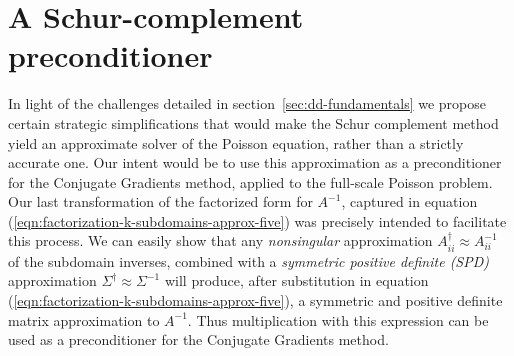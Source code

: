 \section{A Schur-complement preconditioner}
\label{sec:schur-complement-preconditioner}

In light of the challenges detailed in section~\ref{sec:dd-fundamentals} we propose certain strategic simplifications that would make the Schur complement method
yield an approximate solver of the Poisson equation, rather than a strictly accurate one. Our intent would be to use this approximation as a preconditioner for the
Conjugate Gradients method, applied to the full-scale Poisson problem. Our last transformation of the factorized form for $A^{-1}$, captured in equation
(\ref{eqn:factorization-k-subdomains-approx-five}) was precisely intended to facilitate this process. We can easily show that any \emph{nonsingular} approximation
$A_{ii}^\dagger\approx A_{ii}^{-1}$ of the subdomain inverses, combined with a \emph{symmetric positive definite (SPD)} approximation $\Sigma^\dagger\approx\Sigma^{-1}$
will produce, after substitution in equation
(\ref{eqn:factorization-k-subdomains-approx-five}), a symmetric and positive definite matrix approximation to
$A^{-1}$. Thus multiplication with this expression can be used as a preconditioner for the Conjugate Gradients method.


